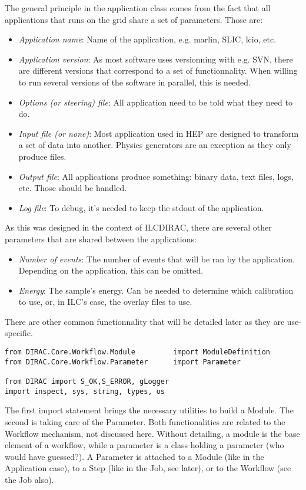 \documentclass[a4paper,12pt]{article}
\begin{document}
The general principle in the application class comes from the fact that all
applications that runs on the grid share a set of parameters. Those are:
\begin{itemize}
  \item \emph{Application name}: Name of the application, e.g. marlin, SLIC,
  lcio, etc.
  \item \emph{Application version}: As most software uses versionning with e.g.
  SVN, there are different versions that correspond to a set of functionnality. When
  willing to run several versions of the software in parallel, this is needed.
  \item \emph{Options (or steering) file}: All application need to be told what
  they need to do. 
  \item \emph{Input file (or none)}: Most application used in HEP are designed
  to transform a set of data into another. Physics generators are an exception as
  they only produce files.
  \item \emph{Output file}: All applications produce something: binary data,
  text files, logs, etc. Those should be handled.
  \item \emph{Log file}: To debug, it's needed to keep the stdout of the
  application.
\end{itemize}
As this was designed in the context of ILCDIRAC, there are several other
parameters that are shared between the applications:
\begin{itemize}
  \item \emph{Number of events}: The number of events that will be ran by the
  application. Depending on the application, this can be omitted.
  \item \emph{Energy}: The sample's energy. Can be needed to determine which
  calibration to use, or, in ILC's case, the overlay files to use.
\end{itemize}
There are other common functionnality that will be detailed later as they are
use-specific.

\begin{lstlisting}[name=appli]
from DIRAC.Core.Workflow.Module         import ModuleDefinition
from DIRAC.Core.Workflow.Parameter      import Parameter

from DIRAC import S_OK,S_ERROR, gLogger
import inspect, sys, string, types, os
\end{lstlisting}

The first import statement brings the necessary utilities to build a Module. The
second is taking care of the Parameter. Both functionalities are related to the
Workflow mechanism, not discussed here. Without detailing, a module is the base
element of a workflow, while a parameter is a class holding a parameter (who
would have guessed?). A Parameter is attached to a Module (like in the
Application case), to a Step (like in the Job, see later), or to the Workflow
(see the Job also). 
\end{document}
